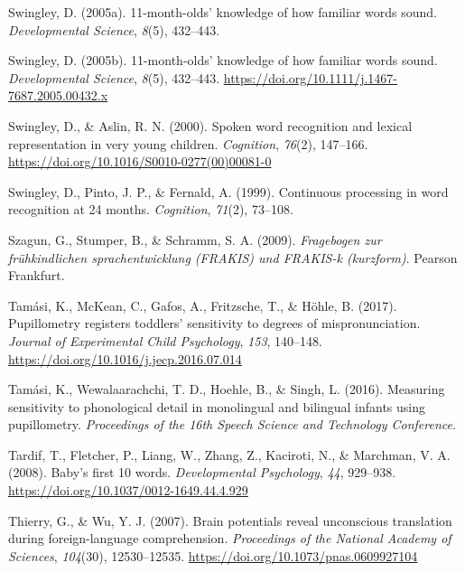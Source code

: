 \documentclass[
  12pt,
  b5paperpaper,
  twoside]{scrreprt}
\newlength{\cslhangindent}
\newlength{\cslentryspacingunit} %
\newenvironment{CSLReferences}[2] %
 {%
  \setlength{\parindent}{0pt}
  \ifodd #1
  \let\oldpar\par
  \def\par{\hangindent=\cslhangindent\oldpar}
  \fi
  \setlength{\parskip}{#2\cslentryspacingunit}
 }%
 {}
\begin{document}
\begin{CSLReferences}{1}{0}
\leavevmode{}%
Swingley, D. (2005a). 11-month-olds' knowledge of how familiar words
sound. \emph{Developmental Science}, \emph{8}(5), 432--443.

\leavevmode{}%
Swingley, D. (2005b). 11-month-olds' knowledge of how familiar words
sound. \emph{Developmental Science}, \emph{8}(5), 432--443.
\url{https://doi.org/10.1111/j.1467-7687.2005.00432.x}

\leavevmode{}%
Swingley, D., \& Aslin, R. N. (2000). Spoken word recognition and
lexical representation in very young children. \emph{Cognition},
\emph{76}(2), 147--166.
\url{https://doi.org/10.1016/S0010-0277(00)00081-0}

\leavevmode{}%
Swingley, D., Pinto, J. P., \& Fernald, A. (1999). Continuous processing
in word recognition at 24 months. \emph{Cognition}, \emph{71}(2),
73--108.

\leavevmode{}%
Szagun, G., Stumper, B., \& Schramm, S. A. (2009). \emph{Fragebogen zur
fr{ü}hkindlichen sprachentwicklung (FRAKIS) und FRAKIS-k (kurzform)}.
Pearson Frankfurt.

\leavevmode{}%
Tamási, K., McKean, C., Gafos, A., Fritzsche, T., \& Höhle, B. (2017).
Pupillometry registers toddlers' sensitivity to degrees of
mispronunciation. \emph{Journal of Experimental Child Psychology},
\emph{153}, 140--148. \url{https://doi.org/10.1016/j.jecp.2016.07.014}

\leavevmode{}%
Tamási, K., Wewalaarachchi, T. D., Hoehle, B., \& Singh, L. (2016).
Measuring sensitivity to phonological detail in monolingual and
bilingual infants using pupillometry. \emph{Proceedings of the 16th
Speech Science and Technology Conference}.

\leavevmode{}%
Tardif, T., Fletcher, P., Liang, W., Zhang, Z., Kaciroti, N., \&
Marchman, V. A. (2008). Baby's first 10 words. \emph{Developmental
Psychology}, \emph{44}, 929--938.
\url{https://doi.org/10.1037/0012-1649.44.4.929}

\leavevmode{}%
Thierry, G., \& Wu, Y. J. (2007). Brain potentials reveal unconscious
translation during foreign-language comprehension. \emph{Proceedings of
the National Academy of Sciences}, \emph{104}(30), 12530--12535.
\url{https://doi.org/10.1073/pnas.0609927104}


\end{CSLReferences}
\end{document}

